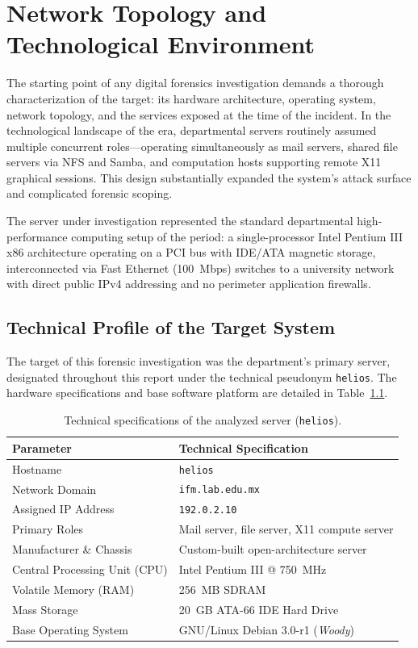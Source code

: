 \chapter{Network Topology and Technological Environment}

The starting point of any digital forensics investigation demands a thorough characterization of the target: its hardware architecture, operating system, network topology, and the services exposed at the time of the incident. In the technological landscape of the era, departmental servers routinely assumed multiple concurrent roles---operating simultaneously as mail servers, shared file servers via NFS and Samba, and computation hosts supporting remote X11 graphical sessions. This design substantially expanded the system's attack surface and complicated forensic scoping.

\begin{notaforense}
The server under investigation represented the standard departmental high-performance computing setup of the period: a single-processor Intel Pentium III x86 architecture operating on a PCI bus with IDE/ATA magnetic storage, interconnected via Fast Ethernet (100~Mbps) switches to a university network with direct public IPv4 addressing and no perimeter application firewalls.
\end{notaforense}

\section{Technical Profile of the Target System}

The target of this forensic investigation was the department's primary server, designated throughout this report under the technical pseudonym \texttt{helios}. The hardware specifications and base software platform are detailed in Table~\ref{tab:ficha_victima1}.

\begin{table}[htbp]
\centering
\small
\begin{tabularx}{\textwidth}{@{} l X @{}}
\toprule
\textbf{Parameter} & \textbf{Technical Specification} \\
\midrule
Hostname & \texttt{helios} \\
Network Domain & \texttt{ifm.lab.edu.mx} \\
Assigned IP Address & \texttt{192.0.2.10} \\
Primary Roles & Mail server, file server, X11 compute server \\
Manufacturer \& Chassis & Custom-built open-architecture server \\
Central Processing Unit (CPU) & Intel Pentium III @ 750~MHz \\
Volatile Memory (RAM) & 256~MB SDRAM \\
Mass Storage & 20~GB ATA-66 IDE Hard Drive \\
Base Operating System & GNU/Linux Debian 3.0-r1 (\textit{Woody}) \\
\bottomrule
\end{tabularx}
\caption{Technical specifications of the analyzed server (\texttt{helios}).}
\label{tab:ficha_victima1}
\end{table}

